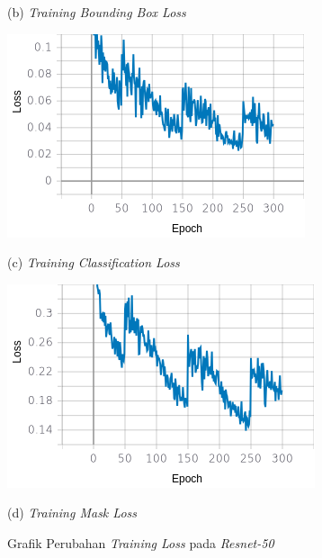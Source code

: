 \begin{figure}[H]
\begin{minipage}{0.45\textwidth}
		\caption*{(b) \textit{Training Bounding Box Loss}}
	\end{minipage}
	\vfill
	\begin{minipage}{0.45\textwidth}
		\includegraphics[width=\textwidth]{gambar/training_resnet50/tugas-akhir-Page-12-(2).png}
		\caption*{(c) \textit{Training Classification Loss}}
	\end{minipage}
	\hfill
	\begin{minipage}{0.45\textwidth}
		\includegraphics[width=\textwidth]{gambar/training_resnet50/tugas-akhir-Page-12-(3).png}
		\caption*{(d) \textit{Training Mask Loss}}
	\end{minipage}
	\caption{Grafik Perubahan \textit{Training Loss} pada \textit{Resnet-50}}
	\label{fig:resnet50-training}
\end{figure}

